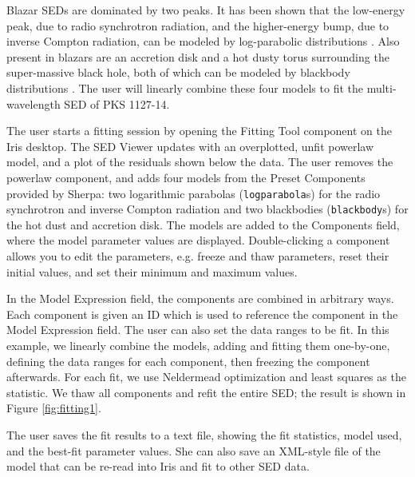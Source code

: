 \documentclass[preprint,12pt,3p]{elsarticle}
\begin{document}
Blazar SEDs are dominated by two peaks. It has been shown that the low-energy peak, due to radio synchrotron radiation, and the higher-energy bump, due to inverse Compton radiation, can be modeled by log-parabolic distributions \citep{2006A&A...448..861M,2009A&A...501..879T}. Also present in blazars are an accretion disk and a hot dusty torus surrounding the super-massive black hole, both of which can be modeled by blackbody distributions \citep{2002ApJ...575..667D}. The user will linearly combine these four models to fit the multi-wavelength SED of PKS 1127-14.  

The user starts a fitting session by opening the Fitting Tool component on the Iris desktop. The SED Viewer updates with an overplotted, unfit powerlaw model, and a plot of the residuals shown below the data. The user removes the powerlaw component, and adds four models from the Preset Components provided by Sherpa: two logarithmic parabolas (\texttt{logparabola}s) for the radio synchrotron and inverse Compton radiation and two blackbodies (\texttt{blackbody}s) for the hot dust and accretion disk. The models are added to the Components field, where the model parameter values are displayed. Double-clicking a component allows you to edit the parameters, e.g. freeze and thaw parameters, reset their initial values, and set their minimum and maximum values. 

In the Model Expression field, the components are combined in arbitrary ways. Each component is given an ID which is used to reference the component in the Model Expression field. The user can also set the data ranges to be fit. In this example, we linearly combine the models, adding and fitting them one-by-one, defining the data ranges for each component, then freezing the component afterwards. For each fit, we use Neldermead optimization and least squares as the statistic. We thaw all components and refit the entire SED; the result is shown in Figure \ref{fig:fitting1}. 

The user saves the fit results to a text file, showing the fit statistics, model used, and the best-fit parameter values. She can also save an XML-style file of the model that can be re-read into Iris and fit to other SED data.
\end{document}
